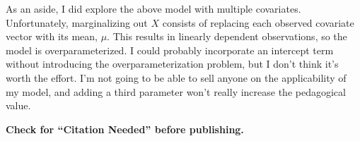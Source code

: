\documentclass[11pt, oneside]{article}   	%
\begin{document}
\begin{appendices}
    As an aside, I did explore the above model with multiple covariates. Unfortunately, marginalizing out $X$ consists of replacing each observed covariate vector with its mean, $\mu$. This results in linearly dependent observations, so the model is overparameterized. I could probably incorporate an intercept term without introducing the overparameterization problem, but I don't think it's worth the effort. I'm not going to be able to sell anyone on the applicability of my model, and adding a third parameter won't really increase the pedagogical value.

\end{appendices}

\textbf{Check for ``Citation Needed'' before publishing.}





\printindex
\end{document}
